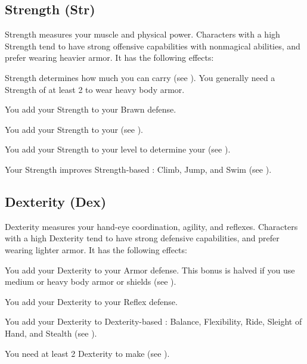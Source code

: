   \subsection{Strength (Str)}\label{Strength}
    {
      Strength measures your muscle and physical power.
      Characters with a high Strength tend to have strong offensive capabilities with nonmagical abilities, and prefer wearing heavier armor.
      It has the following effects:
      \begin{raggeditemize}
        \item Strength determines how much you can carry (see ).
          You generally need a Strength of at least 2 to wear heavy body armor.
        \item You add your Strength to your Brawn defense.
        \item You add your Strength to your  (see ).
        \item You add your Strength to your level to determine your  (see ).
        \item Your Strength improves Strength-based : Climb, Jump, and Swim (see ).
      \end{raggeditemize}
    }

  \subsection{Dexterity (Dex)}\label{Dexterity}
    {
      Dexterity measures your hand-eye coordination, agility, and reflexes.
      Characters with a high Dexterity tend to have strong defensive capabilities, and prefer wearing lighter armor.
      It has the following effects:
      \begin{raggeditemize}
        \item You add your Dexterity to your Armor defense.
          This bonus is halved if you use medium or heavy body armor or shields (see ).
        \item You add your Dexterity to your Reflex defense.
        \item You add your Dexterity to Dexterity-based : Balance, Flexibility, Ride, Sleight of Hand, and Stealth (see ).
        \item You need at least 2 Dexterity to make  (see ).
      \end{raggeditemize}
    }

